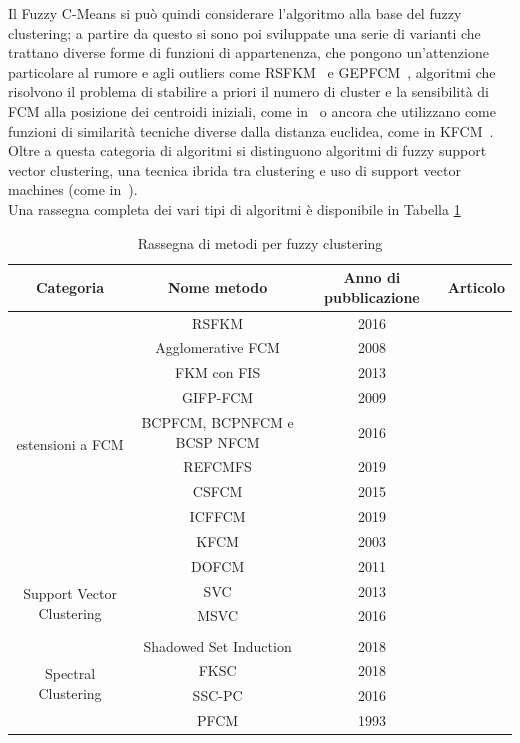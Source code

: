 \documentclass[oneside, openany]{book}
\begin{document}
		Il Fuzzy C-Means si può quindi considerare l'algoritmo alla base del fuzzy clustering; a partire da questo si sono poi sviluppate una serie di varianti che trattano diverse forme di funzioni di appartenenza, che pongono un'attenzione particolare al rumore e agli outliers come RSFKM~\cite{bib:rsfkm} e GEPFCM~\cite{bib:gifpfcm}, algoritmi che risolvono il problema di stabilire a priori il numero di cluster e la sensibilità di FCM alla posizione dei centroidi iniziali, come in~\cite{bib:afkm} o ancora che utilizzano come funzioni di similarità tecniche diverse dalla distanza euclidea, come in KFCM~\cite{bib:kfcm}.
		\\
		Oltre a questa categoria di algoritmi si distinguono algoritmi di fuzzy support vector clustering, una tecnica ibrida tra clustering e uso di support vector machines (come in~\cite{bib:svc}\cite{bib:msvc}).
		\\
		Una rassegna completa dei vari tipi di algoritmi è disponibile in Tabella \ref{tab:clustering}
		\begin{table}[h!]
			\caption{Rassegna di metodi per fuzzy clustering}
			\begin{center}\begin{tabular}{ |c|c|c|c| } 
					\hline
					Categoria & Nome metodo & Anno di pubblicazione & Articolo\\
					\hline
					\multirow{10}{4em}{estensioni a FCM} & RSFKM & 2016 & \cite{bib:rsfkm}\\ 
					& Agglomerative FCM & 2008 & \cite{bib:afkm}\\
					& FKM con FIS & 2013 & \cite{bib:fkmfis}\\ 
					& GIFP-FCM & 2009 & \cite{bib:gifpfcm}\\
					& BCPFCM, BCPNFCM e BCSP NFCM & 2016 & \cite{bib:bcpfcm}\\
					& REFCMFS & 2019 & \cite{bib:refcmfs}\\ 
					& CSFCM & 2015 & \cite{bib:csfcm}\\
					& ICFFCM & 2019 &\cite{bib:icffcm}\\
					& KFCM & 2003 &\cite{bib:kfcm}\\
					& DOFCM & 2011 & \cite{bib:dofcm}\\
					\hline													
					\multirow{2}{4em}{Support Vector Clustering}	& SVC & 2013 & \cite{bib:svc}\\ 
					& MSVC & 2016 & \cite{bib:msvc}\\ 
					&  &  & \\
					\hline
					& Shadowed Set Induction & 2018 & \cite{bib:ssi} \\
					\hline
					\multirow{2}{4em}{Spectral Clustering}	& FKSC & 2018 & \cite{bib:fksc}\\ 
					& SSC-PC & 2016 & \cite{bib:sscpc}\\ 
					\hline
					& PFCM & 1993 & \cite{bib:pfcm}\\
					\hline
				\end{tabular}
			\end{center}
			\label{tab:clustering}	
		\end{table}
	
\end{document}
